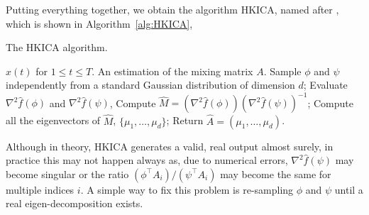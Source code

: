 \documentclass[twoside,11pt]{article}
\begin{document}
Putting everything together, we obtain the algorithm HKICA, named after \citet{hsu2013learning}, which is shown in Algorithm~\ref{alg:HKICA},
\begin{algorithm}[H]
\caption{The HKICA algorithm.}
\label{alg:HKICA}
\begin{algorithmic}[1]
\INPUT $x(t)$ for $1\le t \le T$. 
\OUTPUT An estimation of the mixing matrix $A$. 
\STATE Sample $\phi$ and $\psi$ independently from a standard Gaussian distribution of dimension $d$;
\STATE Evaluate $\nabla^2\hat{f}(\phi)$ and $\nabla^2\hat{f}(\psi)$, 
\STATE Compute $\hat{M} = (\nabla^2 \hat{f}(\phi))(\nabla^2\hat{f}(\psi))^{-1}$;
\STATE Compute all the eigenvectors of $\hat{M}$, $\{\mu_1,\ldots,\mu_d\}$;
\STATE Return $\hat{A} = (\mu_1,\ldots,\mu_d)$.
\end{algorithmic}
\end{algorithm}

\begin{remark}%
\label{rmk:symmetrization} 
Although in theory, HKICA generates a valid, real output almost surely, in practice this may not happen always as, due to numerical errors, $\nabla^2\hat{f}(\psi)$ may become singular or the ratio $(\phi^\top A_i)/(\psi^\top A_i)$ may become the same for multiple indices $i$. A simple way to fix this problem is re-sampling $\phi$ and $\psi$ until a real eigen-decomposition exists.

\end{remark}
\end{document}
